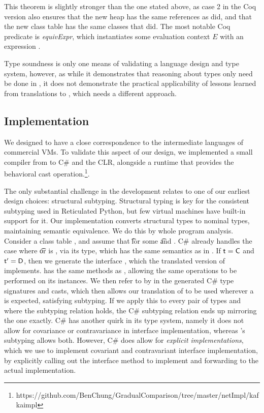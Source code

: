 \documentclass[a4paper,USenglish]{tex/lipics-v2016}
\begin{document}
This theorem is slightly stronger than the one stated above, as case 2 in the
Coq version also ensures that the new heap \sp has the same references as \s
did, and that the new class table \Kp has the same classes that \K did. The
most notable Coq predicate is \emph{equivExpr}, which instantiates some
evaluation context $E$ with an expression \e.

Type soundness is only one means of validating a language design and type
system, however, as while it demonstrates that reasoning about types only need
be done in \kafka, it does not demonstrate the practical applicability of 
lessons learned from translations to \kafka, which needs a different approach.

\subsection{Implementation}

We designed \kafka to have a close correspondence to the intermediate
languages of commercial VMs. To validate this aspect of our design, we
implemented a small compiler from \kafka to C\# and the CLR, alongside a
runtime that provides the behavioral cast
operation.\footnote{https://github.com/BenChung/GradualComparison/tree/master/netImpl/kafkaimpl}.

The only substantial challenge in the development relates to one of our
earliest design choices: structural subtyping.  Structural typing is key for
the consistent subtyping used in Reticulated Python, but few virtual
machines have built-in support for it. Our implementation converts
structural types to nominal types, maintaining semantic equivalence.  We do
this by whole program analysis. Consider a class table \K, and assume that
\StrSub{}\K\t\tp for some \t and \tp. C\# already handles the case where \t
or \tp is \any, via its  type, which has the same semantics as
\any in \kafka. If $\t=\C$ and $\tp=\D$, then we generate the interface
, which the translated version of \C implements.  has the same
methods as \D, allowing the same operations to be performed on its
instances. We then refer to \D by  in the generated C\# type
signatures and casts, which then allows our translation of \C to be used
wherever a \D is expected, satisfying subtyping. If we apply this to every
pair of types \C and \D where the subtyping relation holds, the C\#
subtyping relation ends up mirroring the \kafka one exactly.  C\# has
another quirk in its type system, namely it does not allow for covariance or
contravariance in interface implementation, whereas \kafka's subtyping
allows both. However, C\# does allow for \emph{explicit implementations},
which we use to implement covariant and contravariant interface
implementation, by explicitly calling out the interface method to implement
and forwarding to the actual implementation.
\end{document}
